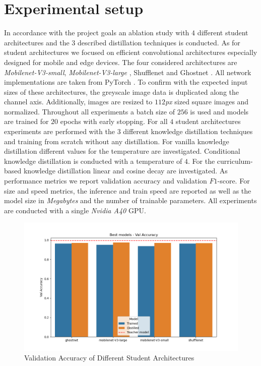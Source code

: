 \documentclass{article}
\begin{document}
\section{Experimental setup}
In accordance with the project goals an ablation study with $ 4 $ different student architectures and the $ 3 $ described distillation techniques is conducted. As for student architectures we focused on efficient convolutional architectures especially designed for mobile and edge devices. The four considered architectures are \textit{Mobilenet-V3-small}, \textit{Mobilenet-V3-large} \cite{mobilenetv3}, Shufflenet \cite{shufflenet} and Ghostnet \cite{han2020ghostnet}. All network implementations are taken from PyTorch \cite{pytorch}. To confirm with the expected input sizes of these architectures, the greyscale image data is duplicated along the channel axis. Additionally, images are resized to $ 112 $\textit{px} sized square images and normalized. Throughout all experiments a batch size of $ 256 $ is used and models are trained for $ 20 $ epochs with early stopping. For all $ 4 $ student architectures experiments are performed with the $ 3 $ different knowledge distillation techniques and training from scratch without any distillation. For vanilla knowledge distillation different values for the temperature are investigated. Conditional knowledge distillation is conducted with a temperature of $ 4 $. For the curriculum-based knowledge distillation linear and cosine decay are investigated.
As performance metrics we report validation accuracy and validation $ F1 $-score. For size and speed metrics, the inference and train speed are reported as well as the model size in \textit{Megabytes} and the number  of trainable parameters.
All experiments are conducted with a single \textit{Nvidia A40} GPU. 

\begin{figure}[H]
	\centering
	\includegraphics[width=0.9\linewidth]{assets/val accuracy_Best}
	\caption{Validation Accuracy of Different Student Architectures}
	\label{fig:acc_res}
\end{figure}
\end{document}

